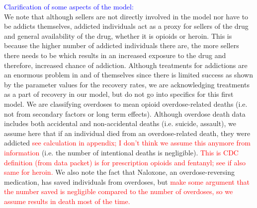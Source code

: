 \documentclass[12pt]{article}
\begin{document}
\textcolor{blue}{Clarification of some aspects of the model:} \\
We note that although sellers are not directly involved in the model nor have to be addicts themselves, addicted individuals act as a proxy for sellers of the drug and general availability of the drug, whether it is opioids or heroin. This is because the higher number of addicted individuals there are, the more sellers there needs to be which results in an increased exposure to the drug and therefore, increased chance of addiction. Although treatments for addictions are an enormous problem in and of themselves since there is limited success as shown by the parameter values for the recovery rates, we are acknowledging treatments as a part of recovery in our model, but do not go into specifics for this first model. We are classifying overdoses to mean opioid overdose-related deaths (i.e. not from secondary factors or long term effects). Although overdose death data includes both accidental and non-accidental deaths (i.e. suicide, assault), we assume here that if an individual died from an overdose-related death, they were addicted \textcolor{red}{see calculation in appendix; I don't think we assume this anymore from \cite{Gwira} information} (i.e. the number of intentional deaths is negligible). \textcolor{red}{This is CDC definition (from data packet) is for prescription opioids and fentanyl; see if also same for heroin.}
We also note the fact that Naloxone, an overdose-reversing medication, has saved individuals from overdoses, but \cite{NIDA2} \textcolor{red}{make some argument that the number saved is negligible compared to the number of overdoses, so we assume results in death most of the time.}\\ 
\end{document}

